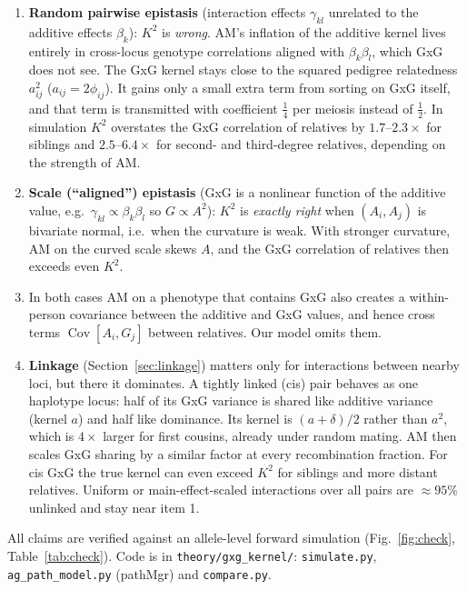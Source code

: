 \documentclass[11pt]{article}
\newcommand{\Cov}{\operatorname{Cov}}
\begin{document}
\begin{enumerate}
  \item \textbf{Random pairwise epistasis} (interaction effects $\gamma_{kl}$ unrelated to the additive
    effects $\beta_k$): $K^2$ is \emph{wrong}. AM's inflation of the additive kernel lives entirely in
    cross-locus genotype correlations aligned with $\beta_k\beta_l$, which GxG does not see. The GxG kernel
    stays close to the squared pedigree relatedness $a_{ij}^2$ ($a_{ij}=2\phi_{ij}$). It gains only a small
    extra term from sorting on GxG itself, and that term is transmitted with coefficient $\frac14$ per meiosis
    instead of $\frac12$. In simulation $K^2$ overstates the GxG correlation of relatives by $1.7$--$2.3\times$
    for siblings and $2.5$--$6.4\times$ for second- and third-degree relatives, depending on the strength of
    AM.
  \item \textbf{Scale (``aligned'') epistasis} (GxG is a nonlinear function of the additive value, e.g.\
    $\gamma_{kl}\propto\beta_k\beta_l$ so $G\propto A^2$): $K^2$ is \emph{exactly right} when $(A_i,A_j)$ is
    bivariate normal, i.e.\ when the curvature is weak. With stronger curvature, AM on the curved scale skews
    $A$, and the GxG correlation of relatives then exceeds even $K^2$.
  \item In both cases AM on a phenotype that contains GxG also creates a within-person covariance between the
    additive and GxG values, and hence cross terms $\Cov[A_i,G_j]$ between relatives. Our model omits them.
  \item \textbf{Linkage} (Section~\ref{sec:linkage}) matters only for interactions between nearby loci, but
    there it dominates. A tightly linked (cis) pair behaves as one haplotype locus: half of its GxG
    variance is shared like additive variance (kernel $a$) and half like dominance. Its kernel is
    $(a+\delta)/2$ rather than $a^2$, which is $4\times$ larger for first cousins, already under random mating.
    AM then scales GxG sharing by a similar factor at every recombination fraction. For cis GxG the
    true kernel can even exceed $K^2$ for siblings and more distant relatives. Uniform or main-effect-scaled
    interactions over all pairs are $\approx95\%$ unlinked and stay near item 1.
\end{enumerate}
All claims are verified against an allele-level forward simulation
(Fig.~\ref{fig:check}, Table~\ref{tab:check}). Code is in \texttt{theory/gxg\_kernel/}:
\texttt{simulate.py}, \texttt{ag\_path\_model.py} (pathMgr) and \texttt{compare.py}.
\end{document}
